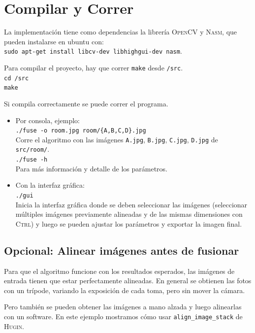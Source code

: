 \documentclass[a4paper,10pt]{article}
\begin{document}
    \newpage
    \section{Compilar y Correr}
    
        La implementación tiene como dependencias la librería \textsc{OpenCV} y \textsc{Nasm}, que pueden instalarse en ubuntu con:\\
        \texttt{sudo apt-get install libcv-dev libhighgui-dev nasm}.
        
        Para compilar el proyecto, hay que correr \texttt{make} desde \texttt{/src}.\\
        \texttt{cd /src}\\
        \texttt{make}
        
        Si compila correctamente se puede correr el programa.
        \begin{itemize}
        \item Por consola, ejemplo:\\
          \texttt{./fuse -o room.jpg room/\{A,B,C,D\}.jpg}\\
          Corre el algoritmo con las imágenes \texttt{A.jpg}, \texttt{B.jpg}, \texttt{C.jpg}, \texttt{D.jpg} de \texttt{src/room/}.\\
          \texttt{./fuse -h}\\
          Para más información y detalle de los parámetros.
        \item Con la interfaz gráfica:\\
          \texttt{./gui}\\
          Inicia la interfaz gráfica donde se deben seleccionar las imágenes (seleccionar múltiples imágenes previamente alineadas y de las mismas dimensiones con \textsc{Ctrl}) y luego se pueden ajustar los parámetros y exportar la imagen final.
        \end{itemize}
        
        \subsection{Opcional: Alinear imágenes antes de fusionar}
            Para que el algoritmo funcione con los resultados esperados, las imágenes de entrada tienen que estar perfectamente alineadas.
            En general se obtienen las fotos con un trípode, variando la exposición de cada toma, pero sin mover la cámara.
            
            Pero también se pueden obtener las imágenes a mano alzada y luego alinearlas con un software. En este ejemplo mostramos cómo usar \texttt{align\_image\_stack} de \textsc{Hugin}.
            
\end{document}
